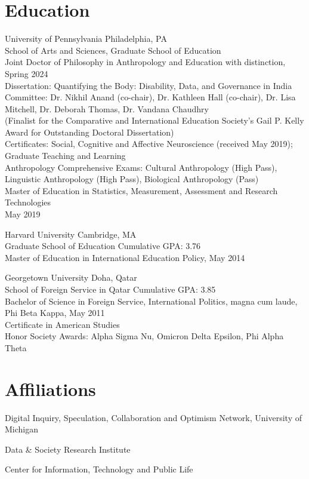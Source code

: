 \documentclass[11pt,letterpaper]{report}
\newcommand{\listitemspace}{0.25em}
\renewenvironment{itemize}{\begin{list}{}{\setlength{\leftmargin}{0em}\setlength{\parskip}{0em}\setlength{\itemsep}{\listitemspace}\setlength{\parsep}{\listitemspace}}}{\end{list}}
\begin{document}
    \section*{Education}
    \begin{itemize}
        \item University of Pennsylvania Philadelphia, PA\\
        School of Arts and Sciences, Graduate School of Education\\
        Joint Doctor of Philosophy in Anthropology and Education with distinction, Spring 2024\\
        Dissertation: Quantifying the Body: Disability, Data, and Governance in India\\
        Committee: Dr. Nikhil Anand (co-chair), Dr. Kathleen Hall (co-chair), Dr. Lisa Mitchell, Dr. Deborah Thomas, Dr. Vandana Chaudhry\\
        (Finalist for the Comparative and International Education Society’s Gail P. Kelly Award for Outstanding Doctoral Dissertation)\\
        Certificates: Social, Cognitive and Affective Neuroscience (received May 2019); Graduate Teaching and Learning\\
        Anthropology Comprehensive Exams: Cultural Anthropology (High Pass), Linguistic Anthropology (High Pass), Biological Anthropology (Pass)\\
        Master of Education in Statistics, Measurement, Assessment and Research Technologies\\
        May 2019
        \item Harvard University Cambridge, MA\\
        Graduate School of Education Cumulative GPA: 3.76\\
        Master of Education in International Education Policy, May 2014
        \item Georgetown University Doha, Qatar\\
        School of Foreign Service in Qatar Cumulative GPA: 3.85\\
        Bachelor of Science in Foreign Service, International Politics, magna cum laude, Phi Beta Kappa, May 2011\\
        Certificate in American Studies\\
        Honor Society Awards: Alpha Sigma Nu, Omicron Delta Epsilon, Phi Alpha Theta
    \end{itemize}

    \section*{Affiliations}
    \begin{itemize}
        \item Digital Inquiry, Speculation, Collaboration and Optimism Network, University of Michigan
        \item Data \& Society Research Institute
        \item Center for Information, Technology and Public Life
    \end{itemize}
\end{document}
